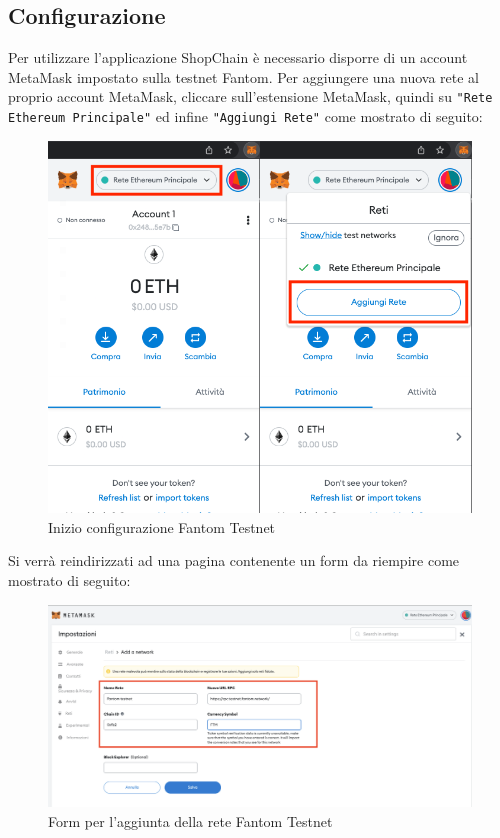 \subsection{Configurazione}

Per utilizzare l'applicazione ShopChain è necessario disporre di un account MetaMask impostato sulla testnet Fantom.
Per aggiungere una nuova rete al proprio account MetaMask, cliccare sull'estensione MetaMask, quindi su \texttt{"Rete Ethereum Principale"}  ed infine \texttt{"Aggiungi Rete"} come mostrato di seguito:
\begin{figure}[H]
    \centering
    \includegraphics[scale=0.4]{immagini/MetaMask/Configuration.png}
    \caption{Inizio configurazione Fantom Testnet}
\end{figure}

Si verrà reindirizzati ad una pagina contenente un form da riempire come mostrato di seguito:

\begin{figure}[H]
    \centering
    \includegraphics[scale=0.3]{immagini/MetaMask/ConfData.png}
    \caption{Form per l'aggiunta della rete Fantom Testnet}
\end{figure} 

